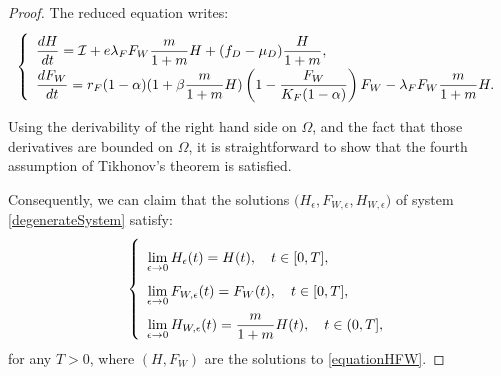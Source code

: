 \documentclass{article}
\newcommand{\lfw}{\lambda_{F}}
\newcommand{\lfw}{\lambda_{F}}
\newcommand{\cI}{\mathcal{I}}
\newcommand{\marc}[1]{\textcolor{teal}{#1}}
\newcommand{\YD}[1]{\textcolor{magenta}{#1}}
\theoremstyle{definition}
\theoremstyle{remark}
\begin{document}
\begin{proof}
The reduced equation writes:
\begin{equation} \label{equationHFW}
\def\arraystretch{2}
\left\lbrace \begin{array}{l}
\dfrac{dH}{dt}= \cI + e\lfw F_W\dfrac{m}{1+m}H + (f_D - \mu_D)\dfrac{H}{1+m}, \\
\dfrac{dF_W}{dt} = r_F(1- \alpha) (1+ \beta \dfrac{m}{1+m}H ) \left(1 - \dfrac{F_W}{K_F(1-\alpha)} \right) F_W - \lfw F_W \dfrac{m}{1+m}H.  \\
\end{array} \right.
\end{equation}

Using the derivability of the right hand side on $\Omega$, and the fact that those derivatives are bounded on $\Omega$, it is straightforward to show that the fourth assumption of Tikhonov's theorem is satisfied.



Consequently, we can claim that the solutions 
$\Big(H_{ \epsilon}, F_{W,  \epsilon}, H_{W,  \epsilon} \Big)$  of system \eqref{degenerateSystem} satisfy:
\begin{equation*}
\def\arraystretch{2}
\left\lbrace \begin{array}{l}
\lim\limits_{ \epsilon \rightarrow 0}{H_{ \epsilon}(t)} = H(t), \quad t \in [0,T], \\
\lim\limits_{ \epsilon \rightarrow 0} F_{W,  \epsilon}(t) = F_W(t),\quad t \in [0,T], \\
 \lim\limits_{ \epsilon \rightarrow 0} H_{W,  \epsilon}(t) = \dfrac{m}{1+m}H(t), \quad  t\in (0,T], \\
\end{array} \right.
\end{equation*}
for any $T > 0$, where $(H, F_W)$ are the solutions to \eqref{equationHFW}. 


\end{proof}
\end{document}
